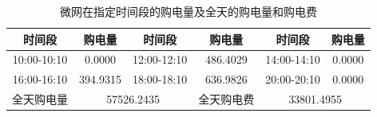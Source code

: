 \begin{table}[htbp]
\centering
\caption{微网在指定时间段的购电量及全天的购电量和购电费}\label{tab:q1-purchase}
\normalsize\setlength{\tabcolsep}{5pt}
\begin{tabular}{@{}cccccc@{}}
\toprule
时间段 & 购电量 & 时间段 & 购电量 & 时间段 & 购电量 \\
\midrule
10:00-10:10 & 0.0000 & 12:00-12:10 & 486.4029 & 14:00-14:10 & 0.0000 \\
16:00-16:10 & 394.9315 & 18:00-18:10 & 636.9826 & 20:00-20:10 & 0.0000 \\
全天购电量 & \multicolumn{2}{c}{57526.2435} & 全天购电费 & \multicolumn{2}{c}{33801.4955} \\
\bottomrule
\end{tabular}
\end{table}
